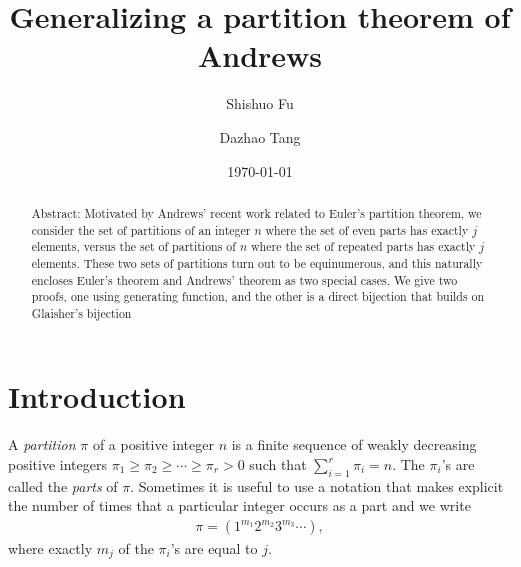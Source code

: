 \documentclass[12pt]{amsart}
\numberwithin{equation}{section}
\theoremstyle{plain}
\theoremstyle{definition}
\begin{document}
\title[Generalizing a partition theorem of Andrews]{Generalizing a partition theorem of Andrews}


\author[S. Fu]{Shishuo Fu}
\address[Shishuo Fu]{College of Mathematics and Statistics, Chongqing University, Huxi Campus LD506, Chongqing 401331, P.R. China}


\author[D. Tang]{Dazhao Tang}

\address[Dazhao Tang]{College of Mathematics and Statistics, Chongqing University, Huxi Campus LD206, Chongqing 401331, P.R. China}

\date{\today}


\begin{abstract}
Abstract: Motivated by Andrews' recent work related to Euler's partition theorem, we consider the set of partitions of an integer $n$ where the set of even parts has exactly $j$ elements, versus the set of partitions of $n$ where the set of repeated parts has exactly $j$ elements. These two sets of partitions turn out to be equinumerous, and this naturally encloses Euler's theorem and Andrews' theorem as two special cases. We give two proofs, one using generating function, and the other is a direct bijection that builds on Glaisher's bijection
\end{abstract}




\maketitle

\section{Introduction}

A \emph{partition} \cite{Andr1} $\pi$ of a positive integer $n$ is a finite sequence of weakly decreasing positive integers $\pi_{1}\geq\pi_{2}\geq\cdots\geq\pi_{r}>0$ such that $\sum_{i=1}^{r}\pi_{i}=n$. The $\pi_{i}$'s are called the \emph{parts} of $\pi$. Sometimes it is useful to use a notation that makes explicit the number of times that a particular integer occurs as a part and we write
\begin{align*}
\pi=(1^{m_{1}}2^{m_{2}}3^{m_{3}}\cdots),
\end{align*}
where exactly $m_{j}$ of the $\pi_{i}$'s are equal to $j$.
\end{document}
